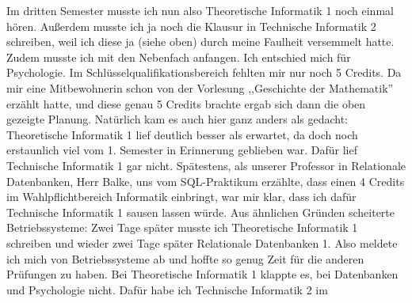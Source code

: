 Im dritten Semester musste ich nun also Theoretische Informatik 1 noch
einmal hören.  Außerdem musste ich ja noch die Klausur in Technische
Informatik 2 schreiben, weil ich diese ja (siehe oben) durch meine
Faulheit versemmelt hatte. Zudem musste ich mit den Nebenfach
anfangen. Ich entschied mich für Psychologie. Im
Schlüsselqualifikationsbereich fehlten mir nur noch 5 Credits. Da mir
eine Mitbewohnerin 
schon von der Vorlesung ,,Geschichte der Mathematik''  erzählt hatte,
und diese genau 5 Credits brachte ergab sich dann die oben gezeigte Planung.
Natürlich kam es auch hier ganz anders als gedacht: Theoretische
Informatik 1 lief deutlich besser als erwartet, da doch noch
erstaunlich viel vom 1. Semester in Erinnerung geblieben war. Dafür
lief Technische Informatik 1 gar nicht. Spätestens, als unserer
Professor in Relationale Datenbanken, Herr Balke, uns vom
SQL-Praktikum erzählte, dass einen 4 Credits im Wahlpflichtbereich
Informatik einbringt, war mir klar, dass ich dafür Technische
Informatik 1 sausen lassen würde. Aus ähnlichen Gründen scheiterte
Betriebssysteme: Zwei Tage später musste ich Theoretische Informatik 1
schreiben und wieder zwei Tage später Relationale Datenbanken 1. Also
meldete ich mich von Betriebssysteme ab und hoffte so genug Zeit für
die anderen Prüfungen zu haben. Bei Theoretische Informatik 1 klappte
es, bei Datenbanken und Psychologie nicht. Dafür habe ich Technische Informatik 2 im
